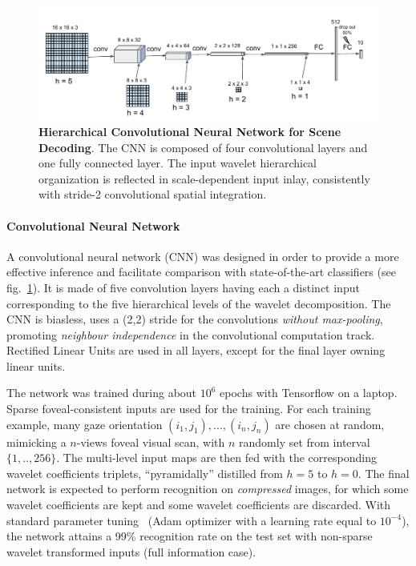 \documentclass[12pt,twoside,openright]{article}
\begin{document}
\begin{figure}
	\centerline{
		\includegraphics[width = \linewidth]{img/frontiers-convolutional.pdf} 
	}
	\vspace{-.2cm}
	\caption{\textbf{Hierarchical Convolutional Neural Network for Scene Decoding}. The CNN is composed of four convolutional layers and one fully connected layer. The input wavelet hierarchical organization is reflected in scale-dependent input inlay, consistently with stride-2 convolutional spatial integration.  }\label{fig:CNN}
\end{figure}

\paragraph{Convolutional Neural Network}
A convolutional neural network (CNN) was designed in order to provide a more effective {\color{Purple} inference} and facilitate comparison with state-of-the-art classifiers (see fig.~\ref{fig:CNN}). 
It is made of five convolution layers having each a distinct input corresponding to the five hierarchical levels of the wavelet decomposition. 
The CNN is biasless, uses a (2,2) stride for the convolutions \emph{without max-pooling}, promoting \emph{neighbour independence} in the convolutional computation track.
Rectified Linear Units are used in all layers, except for the final layer owning linear units. 

The network was trained during about $10^6$ epochs with Tensorflow on a laptop.
{\color{Purple} Sparse foveal-consistent inputs are used for the training. For each training example, many gaze orientation $(i_1,j_1), ..., (i_n,j_n)$ are chosen at random, mimicking a $n$-views foveal visual scan, with $n$ randomly set from interval $\{1,..,256\}$. The multi-level input maps are then fed with the corresponding wavelet coefficients triplets, “pyramidally” distilled from $h = 5$ to $h = 0$.} {\color{Purple} The final network is expected to perform recognition on \emph{compressed} images, for which some wavelet coefficients are kept and some wavelet coefficients are discarded.} With standard parameter tuning { \color{Purple}(Adam optimizer \citep{kingma2014adam} with a learning rate equal to $10^{-4}$)}, the network attains a 99\% recognition rate on the test set with non-{\color{Purple}sparse} wavelet transformed inputs {\color{Purple}(full information case)}. 
\end{document}
